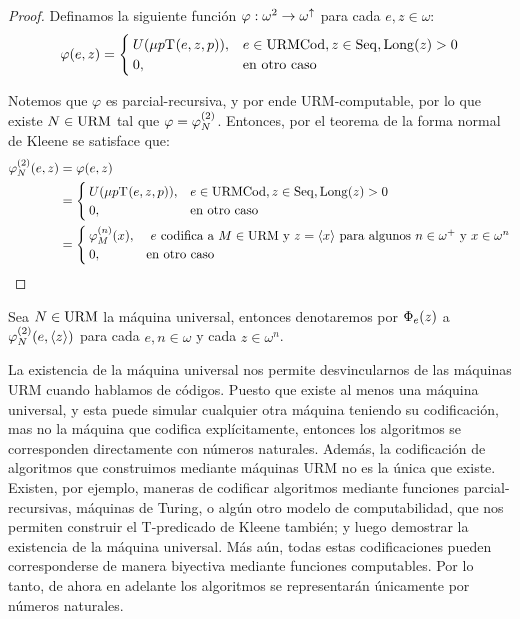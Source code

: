 \begin{proof}
	Definamos la siguiente función $\varphi:\omega^{2}\to\omega^{\uparrow}$ para cada $e, z\in\omega$:
	\[
		\varphi\pa*{e, z} =
		\begin{cases}
			U\pa*{\mu p \KLEENE\pa*{e, z, p}}, & e\in\URMCODIGO, z\in\SECUENCIAS,\LONGITUD\pa*{z} > 0\\
			0, &\text{en otro caso}
		\end{cases}
	\]

	Notemos que $\varphi$ es parcial-recursiva, y por ende URM-computable, por lo que existe $N\in\mathrm{URM}$ tal que $\varphi =\PHI{N}[2]$. Entonces, por el teorema de la forma normal de Kleene se satisface que:
	\begin{align*}
		\PHI{N}[2]\pa*{e, z} &=\varphi\pa*{e, z}\\
		&=
		\begin{cases}
			U\pa*{\mu p \KLEENE\pa*{e, z, p}}, & e\in\URMCODIGO, z\in\SECUENCIAS,\LONGITUD\pa*{z} > 0\\
			0, &\text{en otro caso}
		\end{cases}
		\\
		&=
		\begin{cases}
			\PHI{M}[n]\pa*{x}, &\text{ $e$ codifica a $M\in\URM$ y $z =\inner*{x}$ para algunos $n\in\omega^{+}$ y $x\in\omega^{n}$}\\
			0, &\text{en otro caso}
		\end{cases}
	\end{align*}
\end{proof}

\begin{notation}
	Sea $N\in\mathrm{URM}$ la máquina universal, entonces denotaremos por $\Phi_{e}\pa*{z}$ a $\PHI{N}[2]\pa*{e,\inner*{z}}$ para cada $e, n\in\omega$ y cada $z\in\omega^{n}$.
\end{notation}

La existencia de la máquina universal nos permite desvincularnos de las máquinas URM cuando hablamos de códigos. Puesto que existe al menos una máquina universal, y esta puede simular cualquier otra máquina teniendo su codificación, mas no la máquina que codifica explícitamente, entonces los algoritmos se corresponden directamente con números naturales. Además, la codificación de algoritmos que construimos mediante máquinas URM no es la única que existe. Existen, por ejemplo, maneras de codificar algoritmos mediante funciones parcial-recursivas, máquinas de Turing, o algún otro modelo de computabilidad, que nos permiten construir el T-predicado de Kleene también; y luego demostrar la existencia de la máquina universal. Más aún, todas estas codificaciones pueden corresponderse de manera biyectiva mediante funciones computables. Por lo tanto, de ahora en adelante los algoritmos se representarán únicamente por números naturales.

